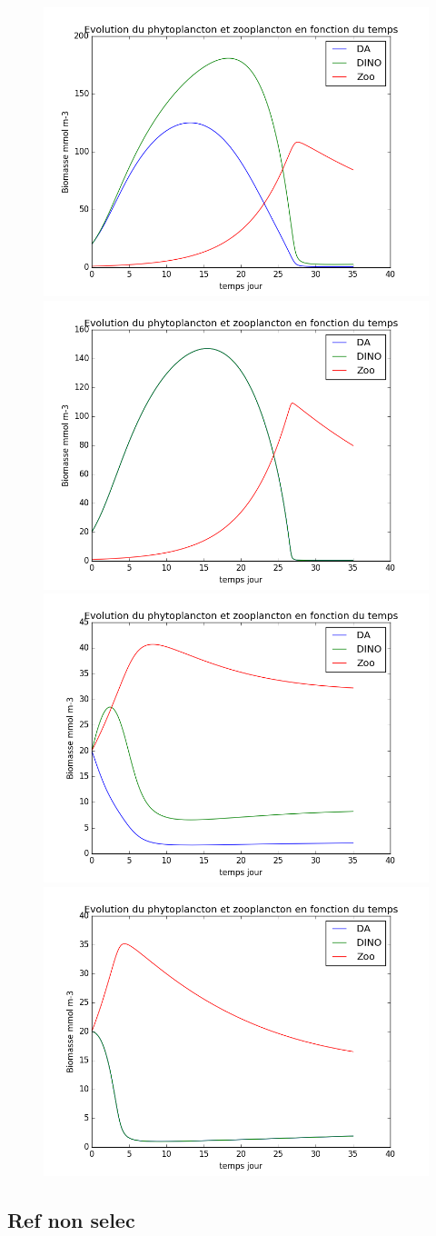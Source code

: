 \begin{figure}
  \includegraphics[width=.5\textwidth]{partie2/test3sel.png}\hfill
  \includegraphics[width=.5\textwidth]{partie2/test3nonsel.png}\\
  \includegraphics[width=.5\textwidth]{partie2/test4sel.png}\hfill
  \includegraphics[width=.5\textwidth]{partie2/test4nonsel.png}
  \caption{\todo}
  \label{fig:partie2Test2}
\end{figure}


\subsection{Ref non selec}



